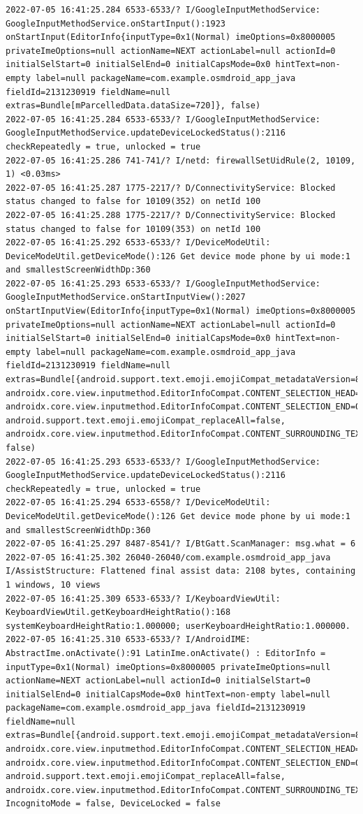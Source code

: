 \documentclass[a4paper,12pt]{book}
\begin{document}
\begin{lstlisting}
2022-07-05 16:41:25.284 6533-6533/? I/GoogleInputMethodService: GoogleInputMethodService.onStartInput():1923 onStartInput(EditorInfo{inputType=0x1(Normal) imeOptions=0x8000005 privateImeOptions=null actionName=NEXT actionLabel=null actionId=0 initialSelStart=0 initialSelEnd=0 initialCapsMode=0x0 hintText=non-empty label=null packageName=com.example.osmdroid_app_java fieldId=2131230919 fieldName=null extras=Bundle[mParcelledData.dataSize=720]}, false)
2022-07-05 16:41:25.284 6533-6533/? I/GoogleInputMethodService: GoogleInputMethodService.updateDeviceLockedStatus():2116 checkRepeatedly = true, unlocked = true
2022-07-05 16:41:25.286 741-741/? I/netd: firewallSetUidRule(2, 10109, 1) <0.03ms>
2022-07-05 16:41:25.287 1775-2217/? D/ConnectivityService: Blocked status changed to false for 10109(352) on netId 100
2022-07-05 16:41:25.288 1775-2217/? D/ConnectivityService: Blocked status changed to false for 10109(353) on netId 100
2022-07-05 16:41:25.292 6533-6533/? I/DeviceModeUtil: DeviceModeUtil.getDeviceMode():126 Get device mode phone by ui mode:1 and smallestScreenWidthDp:360
2022-07-05 16:41:25.293 6533-6533/? I/GoogleInputMethodService: GoogleInputMethodService.onStartInputView():2027 onStartInputView(EditorInfo{inputType=0x1(Normal) imeOptions=0x8000005 privateImeOptions=null actionName=NEXT actionLabel=null actionId=0 initialSelStart=0 initialSelEnd=0 initialCapsMode=0x0 hintText=non-empty label=null packageName=com.example.osmdroid_app_java fieldId=2131230919 fieldName=null extras=Bundle[{android.support.text.emoji.emojiCompat_metadataVersion=8, androidx.core.view.inputmethod.EditorInfoCompat.CONTENT_SELECTION_HEAD=0, androidx.core.view.inputmethod.EditorInfoCompat.CONTENT_SELECTION_END=0, android.support.text.emoji.emojiCompat_replaceAll=false, androidx.core.view.inputmethod.EditorInfoCompat.CONTENT_SURROUNDING_TEXT=}]}, false)
2022-07-05 16:41:25.293 6533-6533/? I/GoogleInputMethodService: GoogleInputMethodService.updateDeviceLockedStatus():2116 checkRepeatedly = true, unlocked = true
2022-07-05 16:41:25.294 6533-6558/? I/DeviceModeUtil: DeviceModeUtil.getDeviceMode():126 Get device mode phone by ui mode:1 and smallestScreenWidthDp:360
2022-07-05 16:41:25.297 8487-8541/? I/BtGatt.ScanManager: msg.what = 6
2022-07-05 16:41:25.302 26040-26040/com.example.osmdroid_app_java I/AssistStructure: Flattened final assist data: 2108 bytes, containing 1 windows, 10 views
2022-07-05 16:41:25.309 6533-6533/? I/KeyboardViewUtil: KeyboardViewUtil.getKeyboardHeightRatio():168 systemKeyboardHeightRatio:1.000000; userKeyboardHeightRatio:1.000000.
2022-07-05 16:41:25.310 6533-6533/? I/AndroidIME: AbstractIme.onActivate():91 LatinIme.onActivate() : EditorInfo = inputType=0x1(Normal) imeOptions=0x8000005 privateImeOptions=null actionName=NEXT actionLabel=null actionId=0 initialSelStart=0 initialSelEnd=0 initialCapsMode=0x0 hintText=non-empty label=null packageName=com.example.osmdroid_app_java fieldId=2131230919 fieldName=null extras=Bundle[{android.support.text.emoji.emojiCompat_metadataVersion=8, androidx.core.view.inputmethod.EditorInfoCompat.CONTENT_SELECTION_HEAD=0, androidx.core.view.inputmethod.EditorInfoCompat.CONTENT_SELECTION_END=0, android.support.text.emoji.emojiCompat_replaceAll=false, androidx.core.view.inputmethod.EditorInfoCompat.CONTENT_SURROUNDING_TEXT=}], IncognitoMode = false, DeviceLocked = false

\end{lstlisting}
\end{document}
